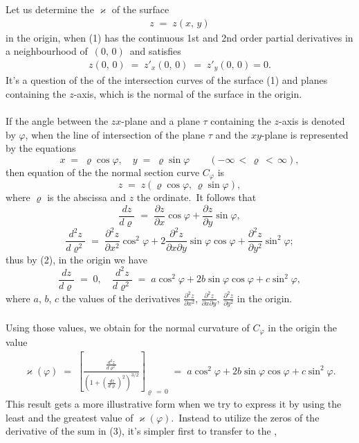 \documentclass[12pt]{article}
\theoremstyle{definition}
\begin{document}
Let us determine the  $\varkappa$ of the surface
\begin{align}
z \;=\; z(x,\,y)
\end{align}
in the origin, when (1) has the continuous 1st and 2nd order partial derivatives in a neighbourhood of\, $(0,\,0)$\, and satisfies
\begin{align}
z(0,\,0) \;=\; z'_x(0,\,0) \;=\; z'_y(0,\,0) = 0.
\end{align}
It's a question of the  of the intersection curves of the surface (1) and planes containing the $z$-axis, which is the normal of the surface in the origin.\\ \\

If the angle between the $zx$-plane and a plane $\tau$ containing the $z$-axis is denoted by $\varphi$, when the line of intersection of the plane $\tau$ and the $xy$-plane is represented by the equations
$$x \;=\; \varrho\cos\varphi,\quad y \;=\; \varrho\sin\varphi \qquad (-\infty \,<\, \varrho \,<\, \infty),$$
then equation of the the normal section curve $C_\varphi$ is
$$z \;=\; z(\varrho\cos\varphi,\,\varrho\sin\varphi),$$
where $\varrho$ is the abscissa and $z$ the ordinate.\, It follows that
$$\frac{dz}{d\varrho} \;=\; \frac{\partial z}{\partial x}\cos\varphi+\frac{\partial z}{\partial y}\sin\varphi,$$
$$\frac{d^2z}{d\varrho^2} \;=\; 
\frac{\partial^2z}{\partial x^2}\cos^2\!\varphi+2\frac{\partial^2z}{\partial x \partial y}\sin\varphi\cos\varphi+
\frac{\partial^2z}{\partial y^2}\sin^2\!\varphi;$$
thus by (2), in the origin we have
$$\frac{dz}{d\varrho} \;=\; 0,\quad 
\frac{d^2z}{d\varrho^2} \;=\; a\cos^2\!\varphi+2b\sin\varphi\cos\varphi+c\sin^2\!\varphi,$$
where $a$, $b$, $c$  the values of the derivatives $\frac{\partial^2z}{\partial x^2}$, 
$\frac{\partial^2z}{\partial x \partial y}$, $\frac{\partial^2z}{\partial y^2}$ in the origin.\\ \\
Using those values, we obtain for the normal curvature of $C_\varphi$ in the origin the value
\begin{align}
\varkappa(\varphi) \;=\; 
\left[\frac{\frac{d^2z}{d\varrho^2}}{\left(1+\left(\frac{dz}{d\varrho}\right)^2\right)^{3/2}}\right]_{\varrho\,=\,0}
\;=\; a\cos^2\!\varphi+2b\sin\varphi\cos\varphi+c\sin^2\!\varphi.
\end{align}
This result gets a more illustrative form when we try to express it by using the least and the greatest value of $\varkappa(\varphi)$.\, Instead to utilize the zeros of the derivative of the sum in (3), it's simpler first to transfer to the ,
\end{document}
